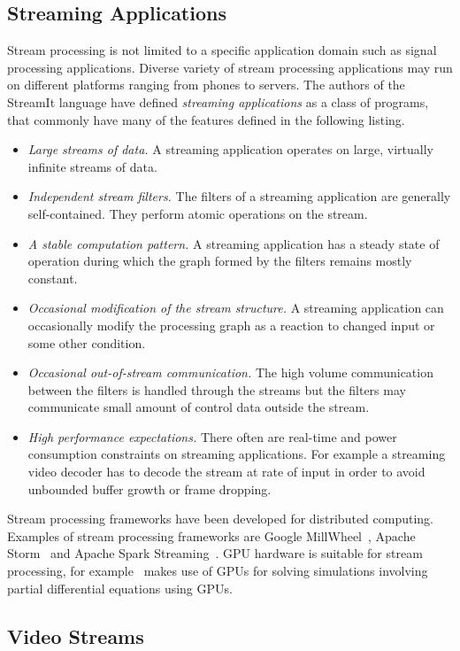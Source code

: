 \subsection{Streaming Applications}
\label{subsec:streaming-applications}
Stream processing is not limited to a specific application domain such as signal processing applications. Diverse variety of stream processing applications may run on different platforms ranging from phones to servers. The authors of the StreamIt language \cite{thies2002streamit} have defined \textit{streaming applications} as a class of programs, that commonly have many of the features defined in the following listing.

\begin{itemize}
    \item \textit{Large streams of data.} A streaming application operates on large, virtually infinite streams of data.
    \item \textit{Independent stream filters.} The filters of a streaming application are generally self-contained. They perform atomic operations on the stream.
    \item \textit{A stable computation pattern.} A streaming application has a steady state of operation during which the graph formed by the filters remains mostly constant.
    \item \textit{Occasional modification of the stream structure.} A streaming application can occasionally modify the processing graph as a reaction to changed input or some other condition.
    \item \textit{Occasional out-of-stream communication.} The high volume communication between the filters is handled through the streams but the filters may communicate small amount of control data outside the stream.
    \item \textit{High performance expectations.} There often are real-time and power consumption constraints on streaming applications. For example a streaming video decoder has to decode the stream at rate of input in order to avoid unbounded buffer growth or frame dropping.
\end{itemize}

Stream processing frameworks have been developed for distributed computing. Examples of stream processing frameworks are Google MillWheel~\cite{tyler2013millwheel}, Apache Storm~\cite{apache2016storm} and Apache Spark Streaming~\cite{apache2016spark}. GPU hardware is suitable for stream processing, for example~\cite{goddeke2011fast} makes use of GPUs for solving simulations involving partial differential equations using GPUs.

\subsection{Video Streams}
\label{subsec:video-streams}
